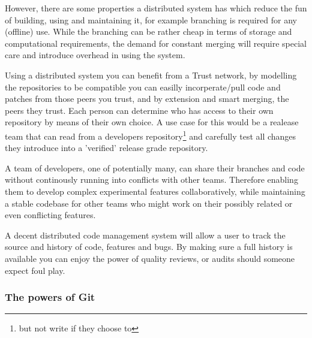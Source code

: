 However, there are some properties a distributed system has which reduce the fun of building, using and maintaining it,
for example branching is required for any (offline) use. While the branching can
be rather cheap in terms of storage and computational requirements, the demand
for constant merging will require special care and introduce overhead in using
the system.


Using a distributed system you can benefit from a Trust network, by modelling
the repositories to be compatible you can easilly incorperate/pull code and patches
from those peers you trust, and by extension and smart merging, the peers they
trust. Each person can determine who has access to their own repository by means
of their own choice. A use case for this would be a realease team that can read
from a developers repository\footnote{but not write if they choose to} and
carefully test all changes they introduce into a 'verified' release grade
repository.

A team of developers, one of potentially many, can share their branches and
code without continously running into conflicts with other teams. Therefore enabling them to
develop complex experimental features collaboratively, while maintaining a stable codebase for
other teams who might work on their possibly related or even conflicting features.


A decent distributed code management system will allow a user to track the source and history of code, features and bugs.
By making sure a full history is available you can enjoy the power of quality reviews, or audits should someone expect foul play.


\subsubsection{The powers of Git}

